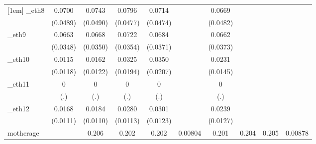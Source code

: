 \begin{table}[htbp]
\begin{tabular}{l*{9}{c}}
[1em]
\_eth8       &      0.0700         &      0.0743         &      0.0796\sym{*}  &      0.0714         &                     &      0.0669         &                     &                     &                     \\
            &    (0.0489)         &    (0.0490)         &    (0.0477)         &    (0.0474)         &                     &    (0.0482)         &                     &                     &                     \\
[1em]
\_eth9       &      0.0663\sym{*}  &      0.0668\sym{*}  &      0.0722\sym{**} &      0.0684\sym{*}  &                     &      0.0662\sym{*}  &                     &                     &                     \\
            &    (0.0348)         &    (0.0350)         &    (0.0354)         &    (0.0371)         &                     &    (0.0373)         &                     &                     &                     \\
[1em]
\_eth10      &      0.0115         &      0.0162         &      0.0325\sym{*}  &      0.0350\sym{*}  &                     &      0.0231         &                     &                     &                     \\
            &    (0.0118)         &    (0.0122)         &    (0.0194)         &    (0.0207)         &                     &    (0.0145)         &                     &                     &                     \\
[1em]
\_eth11      &           0         &           0         &           0         &           0         &                     &           0         &                     &                     &                     \\
            &         (.)         &         (.)         &         (.)         &         (.)         &                     &         (.)         &                     &                     &                     \\
[1em]
\_eth12      &      0.0168         &      0.0184\sym{*}  &      0.0280\sym{**} &      0.0301\sym{**} &                     &      0.0239\sym{*}  &                     &                     &                     \\
            &    (0.0111)         &    (0.0110)         &    (0.0113)         &    (0.0123)         &                     &    (0.0127)         &                     &                     &                     \\
[1em]
motherage   &                     &       0.206\sym{*}  &       0.202\sym{*}  &       0.202\sym{*}  &     0.00804         &       0.201\sym{*}  &       0.204\sym{*}  &       0.205\sym{*}  &     0.00878         \\

\end{tabular}
\end{table}
